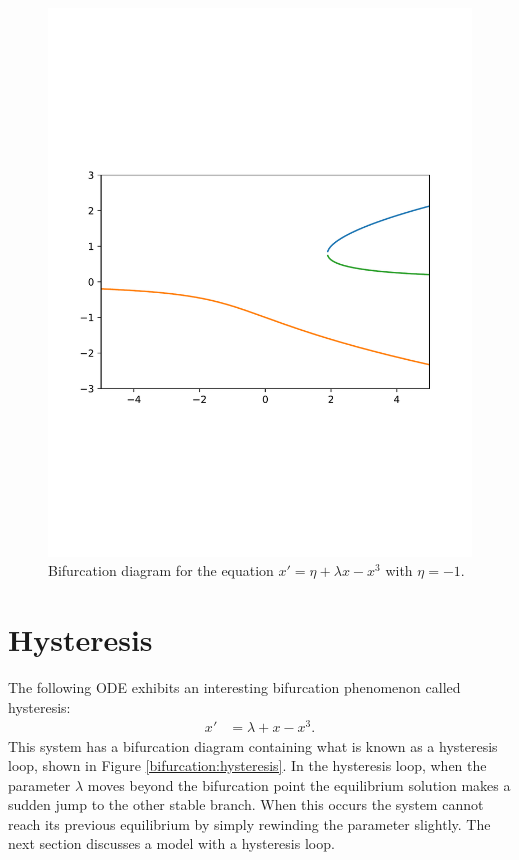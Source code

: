 \begin{figure}
\centering
\includegraphics[width=\textwidth]{prob2.pdf}
\caption{Bifurcation diagram for the equation $x' = \eta + \lambda x - x^3$ with $\eta=-1$.}
\label{prob2}
\end{figure}

\section*{Hysteresis}

The following ODE exhibits an interesting bifurcation phenomenon called hysteresis:
\begin{align*}
	x' &= \lambda + x - x^3.
\end{align*}
This system has a bifurcation diagram containing what is known as a hysteresis loop, shown in Figure \ref{bifurcation:hysteresis}.
In the hysteresis loop, when the parameter $\lambda$ moves beyond the bifurcation point the equilibrium solution makes a sudden jump to the other stable branch.
When this occurs the system cannot reach its previous equilibrium by simply rewinding the parameter slightly. The next section discusses a model with a hysteresis loop.


